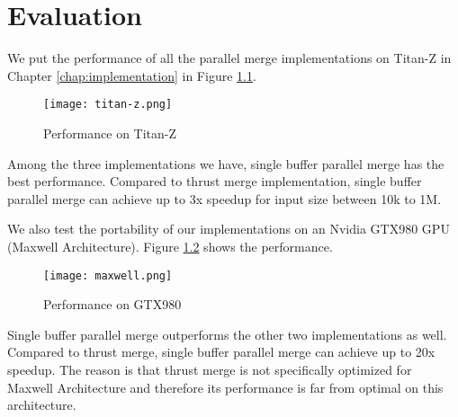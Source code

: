 \chapter{Evaluation}\label{chap:evaluation}
We put the performance of all the parallel merge implementations 
on Titan-Z in Chapter \ref{chap:implementation} in Figure \ref{fig:titan-z}.
\begin{figure}[!bh]
\begin{center}
\texttt{[image: titan-z.png]}
\end{center}
\caption{{\label{fig:titan-z}} Performance on Titan-Z}
\end{figure}

Among the three implementations we have, single buffer parallel merge has the 
best performance. Compared to thrust merge implementation, single buffer 
parallel merge can achieve up to 3x speedup for input size between 10k to 1M.

We also test the portability of our implementations on an Nvidia GTX980 GPU (Maxwell 
Architecture). Figure \ref{fig:maxwell} shows the performance.
\begin{figure}[!bh]
\begin{center}
\texttt{[image: maxwell.png]}
\end{center}
\caption{{\label{fig:maxwell}} Performance on GTX980}
\end{figure}

Single buffer parallel merge outperforms the other two implementations as well.
Compared to thrust merge, single buffer parallel merge can achieve up to 20x 
speedup. The reason is that thrust merge is not specifically optimized for 
Maxwell Architecture and therefore its performance is far from optimal on this 
architecture. 
